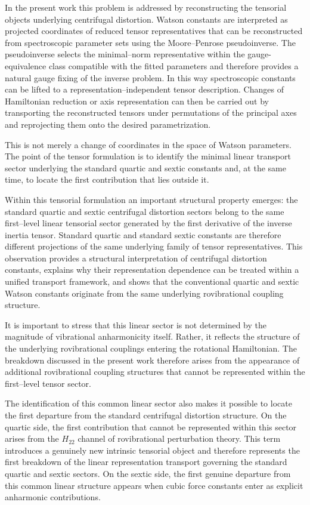 \documentclass[aip,jcp,reprint,floatfix]{revtex4-2}
\begin{document}
In the present work this problem is addressed by reconstructing the
tensorial objects underlying centrifugal distortion.
Watson constants are interpreted as projected coordinates of reduced
tensor representatives that can be reconstructed from spectroscopic
parameter sets using the Moore--Penrose pseudoinverse.
The pseudoinverse selects the minimal--norm representative within the
gauge-equivalence class compatible with the fitted parameters and
therefore provides a natural gauge fixing of the inverse problem. In
this way spectroscopic constants can be lifted to a
representation--independent tensor description.
Changes of Hamiltonian reduction or axis representation can then be
carried out by transporting the reconstructed tensors under permutations
of the principal axes and reprojecting them onto the desired
parametrization.

This is not merely a change of coordinates in the space of Watson
parameters. The point of the tensor formulation is to
identify the minimal linear transport sector underlying the standard
quartic and sextic constants and, at the same time, to locate the first
contribution that lies outside it.

Within this tensorial formulation an important structural property
emerges: the standard quartic and sextic centrifugal distortion sectors
belong to the same first--level linear tensorial sector generated by the
first derivative of the inverse inertia tensor. Standard quartic and
standard sextic constants are therefore different projections of the
same underlying family of tensor representatives. This observation
provides a structural interpretation of centrifugal distortion
constants, explains why their representation dependence can be treated
within a unified transport framework, and shows that the conventional
quartic and sextic Watson constants originate from the same underlying
rovibrational coupling structure.

It is important to stress that this linear sector is not determined by
the magnitude of vibrational anharmonicity itself.
Rather, it reflects the structure of the underlying rovibrational
couplings entering the rotational Hamiltonian.
The breakdown discussed in the present work therefore arises from the
appearance of additional rovibrational coupling structures that cannot
be represented within the first--level tensor sector.

The identification of this common linear sector also makes it possible
to locate the first departure from the standard centrifugal distortion
structure. On the quartic side, the first contribution that cannot be
represented within this sector arises from the $H_{22}$ channel of
rovibrational perturbation theory. This term introduces a genuinely new
intrinsic tensorial object and therefore represents the first breakdown
of the linear representation transport governing the standard quartic
and sextic sectors.
On the sextic side, the first genuine departure from this common linear
structure appears when cubic force constants enter as explicit
anharmonic contributions.
\end{document}
